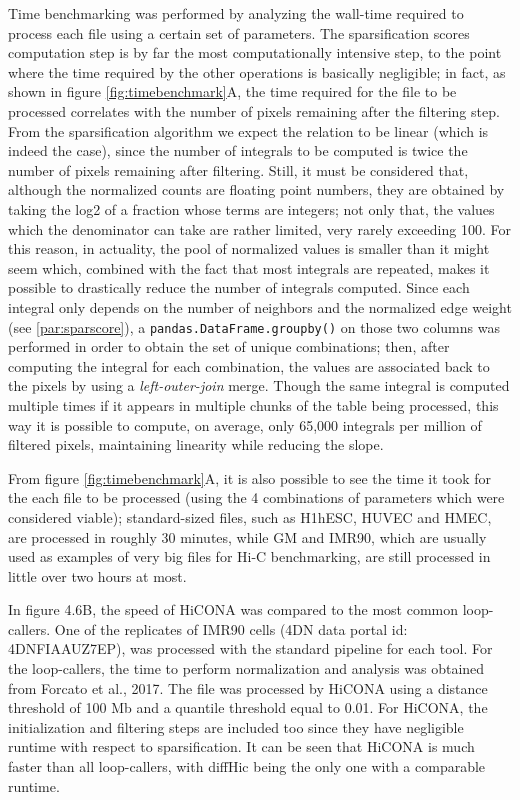Time benchmarking was performed by analyzing the wall-time required to process each file using a certain set of parameters. The sparsification scores computation step is by far the most computationally intensive step, to the point where the time required by the other operations is basically negligible; in fact, as shown in figure \ref{fig:timebenchmark}A, the time required for the file to be processed correlates with the number of pixels remaining after the filtering step. From the sparsification algorithm we expect the relation to be linear (which is indeed the case), since the number of integrals to be computed is twice the number of pixels remaining after filtering. Still, it must be considered that, although the normalized counts are floating point numbers, they are obtained by taking the log2 of a fraction whose terms are integers; not only that, the values which the denominator can take are rather limited, very rarely exceeding 100. For this reason, in actuality, the pool of normalized values is smaller than it might seem which, combined with the fact that most integrals are repeated, makes it possible to drastically reduce the number of integrals computed. Since each integral only depends on the number of neighbors and the normalized edge weight (see \ref{par:sparscore}), a \texttt{pandas.DataFrame.groupby()} on those two columns was performed in order to obtain the set of unique combinations; then, after computing the integral for each combination, the values are associated back to the pixels by using a \textit{left-outer-join} merge. Though the same integral is computed multiple times if it appears in multiple chunks of the table being processed, this way it is possible to compute, on average, only 65,000 integrals per million of filtered pixels, maintaining linearity while reducing the slope.

From figure \ref{fig:timebenchmark}A, it is also possible to see the time it took for the each file to be processed (using the 4 combinations of parameters which were considered viable); standard-sized files, such as H1hESC, HUVEC and HMEC, are processed in roughly 30 minutes, while GM and IMR90, which are usually used as examples of very big files for Hi-C benchmarking, are still processed in little over two hours at most. 

In figure 4.6B, the speed of HiCONA was compared to the most common loop-callers. One of the replicates of IMR90 cells (4DN data portal id: 4DNFIAAUZ7EP), was processed with the standard pipeline for each tool. For the loop-callers, the time to perform normalization and analysis was obtained from Forcato et al., 2017\cite{toolcomparison2017}. The file was processed by HiCONA using a distance threshold of 100 Mb and a quantile threshold equal to 0.01. For HiCONA, the initialization and filtering steps are included too since they have negligible runtime with respect to sparsification. It can be seen that HiCONA is much faster than all loop-callers, with diffHic being the only one with a comparable runtime.

